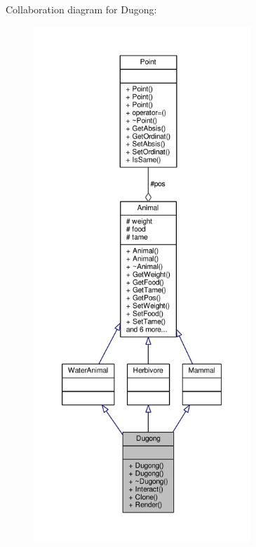 Collaboration diagram for Dugong\+:
\nopagebreak
\begin{figure}[H]
\begin{center}
\leavevmode
\includegraphics[height=550pt]{classDugong__coll__graph}
\end{center}
\end{figure}
